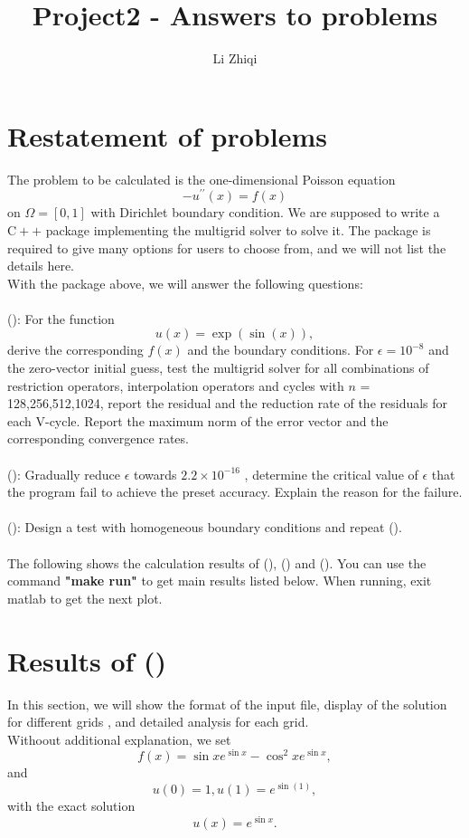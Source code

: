 \documentclass[a4paper,twocolumn]{article}
\title{Project2 - Answers to problems}
\author{Li Zhiqi\quad3180103041}
\theoremstyle{definition}
\begin{document}
\maketitle
\section{Restatement of problems}
The problem to be calculated is the one-dimensional Poisson equation
$$
-u^{\prime \prime}(x)=f(x)
$$
on $\Omega = [0,1]$ with Dirichlet boundary condition. We are supposed to write a  $\mathrm{C}++$ package implementing the multigrid solver to solve it. The package is required to give many options for users to choose from, and we will not list the details here.\\
With the package above, we will answer the following questions:\\\\
(\uppercase\expandafter{}): For the function
$$
u(x) = \exp(\sin(x)),
$$
derive the corresponding $f(x)$ and the boundary conditions. For $\epsilon = 10^{-8}$ and the zero-vector initial guess, test the multigrid solver for all combinations
of restriction operators, interpolation operators and cycles with $n$ = 128,256,512,1024, report the residual and the reduction rate of the residuals for each V-cycle. Report the maximum norm of the error vector and the corresponding convergence rates.\\\\
(\uppercase\expandafter{}): Gradually reduce $\epsilon$ towards $2.2\times10^{-16}$ , determine the critical value of $\epsilon$ that the program fail to achieve the preset accuracy. Explain the reason for the failure.\\\\
(\uppercase\expandafter{}): Design a test with homogeneous boundary conditions and repeat (\uppercase\expandafter{}).\\\\
The following shows the calculation results of (\uppercase\expandafter{}), (\uppercase\expandafter{}) and (\uppercase\expandafter{}).
You can use the command \textbf{"make run"} to get main results listed below. When running, exit matlab to get the next plot.
\section{Results of (\uppercase\expandafter{})}
In this section, we will show the format of the input file, display of the solution for different grids , and detailed analysis for each grid.\\
Withoout additional explanation, we set 
$$
f(x) = \sin x e^{\sin x}-\cos^2 xe^{\sin x},
$$
and
$$
u(0) = 1,u(1) = e^{\sin(1)} ,
$$
with the exact solution
$$
u(x) = e^{\sin x}.
$$ 
\end{document}
